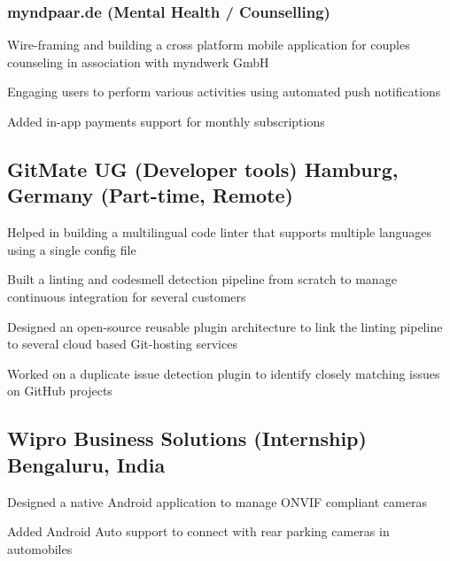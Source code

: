 \documentclass[letter,10pt]{article}
\begin{document}
\subsubsection*{myndpaar.de (Mental Health / Counselling)}
\begin{zitemize}
\item Wire-framing and building a cross platform mobile application for couples counseling in association with myndwerk GmbH
\item Engaging users to perform various activities using automated push notifications
\item Added in-app payments support for monthly subscriptions
\end{zitemize}

\newpage


\subsection{GitMate UG (Developer tools) \hfill Hamburg, Germany (Part-time, Remote)}
\begin{zitemize}
\item Helped in building a multilingual code linter that supports multiple languages using a single config file
\item Built a linting and codesmell detection pipeline from scratch to manage continuous integration for several customers
\item Designed an open-source reusable plugin architecture to link the linting pipeline to several cloud based Git-hosting services
\item Worked on a duplicate issue detection plugin to identify closely matching issues on GitHub projects
\end{zitemize}


\subsection{Wipro Business Solutions (Internship) \hfill Bengaluru, India}
\begin{zitemize}
\item Designed a native Android application to manage ONVIF compliant cameras
\item Added Android Auto support to connect with rear parking cameras in automobiles
\end{zitemize}

\end{document}
